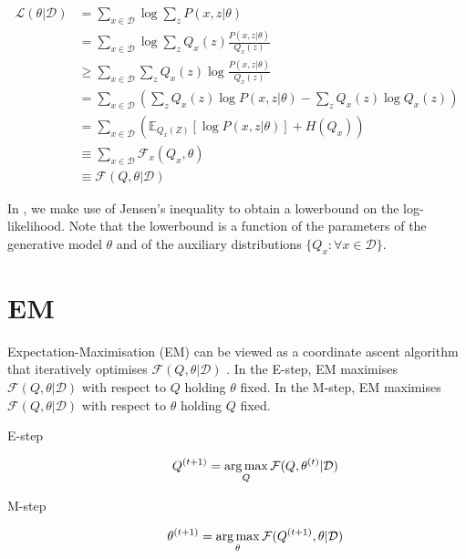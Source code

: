 \begin{subequations}\label{eq:F}
\begin{align}
	\mathcal L(\theta|\mathcal D) &= \sum_{x \in \mathcal D} \log  \sum_z P(x, z|\theta)  \\
		&= \sum_{x \in \mathcal D} \log  \sum_z Q_x(z) \frac{P(x, z|\theta)}{Q_x(z)}  \\
		&\ge \sum_{x \in \mathcal D} \sum_z Q_x(z) \log \frac{P(x, z|\theta)}{Q_x(z)} \label{eq:JS}\\
		&= \sum_{x \in \mathcal D} \left( \sum_z  Q_x(z) \log P(x, z|\theta) - \sum_z Q_x(z) \log Q_x(z) \right)\\
		&= \sum_{x \in \mathcal D} \left(\mathbb E_{Q_x(Z)}[\log P(x, z|\theta)] + H(Q_x) \right)\\
		&\equiv \sum_{x \in \mathcal D} \mathcal F_x(Q_x, \theta)\\
		&\equiv \mathcal  F(Q, \theta | \mathcal D) 
\end{align}
\end{subequations}

In , we make use of Jensen's inequality to obtain a lowerbound on the log-likelihood. Note that the lowerbound is a function of the parameters of the generative model $\theta$ and of the auxiliary distributions $\{Q_x: \forall x \in \mathcal D\}$.

\section{EM}

Expectation-Maximisation (EM) \citep{Dempster+77:EM} can be viewed as a coordinate ascent algorithm that iteratively optimises $\mathcal F(Q, \theta|\mathcal D)$ \citep{Neal+1998:EM}.
In the E-step, EM maximises $\mathcal F(Q, \theta|\mathcal D)$ with respect to $Q$   holding $\theta$ fixed.
In the M-step, EM maximises $\mathcal F(Q, \theta|\mathcal D)$ with respect to $\theta$  holding $Q$ fixed.

\begin{description}
	\item[E-step] \begin{equation} \label{eq:E} Q^{(t+1)} = \operatorname*{arg\,max}_{Q} \mathcal F(Q, \theta^{(t)} | \mathcal D) \end{equation}
	\item[M-step] \begin{equation} \label{eq:M} \theta^{(t+1)} = \operatorname*{arg\,max}_{\theta} \mathcal F(Q^{(t+1)}, \theta | \mathcal D) \end{equation}
\end{description}

